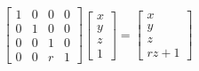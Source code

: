 \documentclass{article}
\begin{document}
\thispagestyle{empty}


$$
\begin{bmatrix}1&0&0&0 \\ 0&1&0&0\\ 0&0&1&0\\ 0 &0 &r&1\end{bmatrix}
\begin{bmatrix}x \\ y \\ z \\ 1\end{bmatrix} = 
\begin{bmatrix}x \\ y \\ z \\ rz+1\end{bmatrix}
$$
\end{document}
